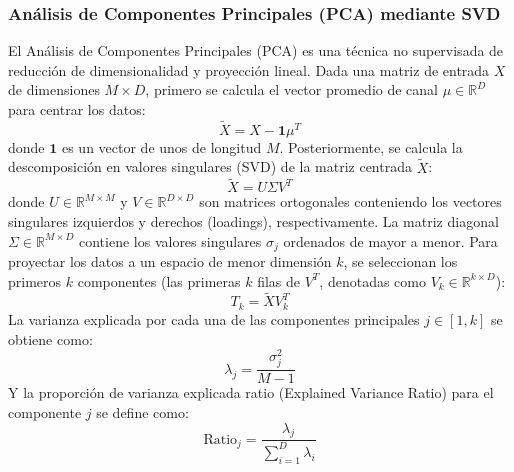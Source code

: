 \subsubsection{Análisis de Componentes Principales (PCA) mediante SVD}
El Análisis de Componentes Principales (PCA) es una técnica no supervisada de reducción de dimensionalidad y proyección lineal. Dada una matriz de entrada $X$ de dimensiones $M \times D$, primero se calcula el vector promedio de canal $\mu \in \mathbb{R}^D$ para centrar los datos:
\begin{equation}
    \tilde{X} = X - \mathbf{1}\mu^T
\end{equation}
donde $\mathbf{1}$ es un vector de unos de longitud $M$. Posteriormente, se calcula la descomposición en valores singulares (SVD) de la matriz centrada $\tilde{X}$:
\begin{equation}
    \tilde{X} = U \Sigma V^T
\end{equation}
donde $U \in \mathbb{R}^{M \times M}$ y $V \in \mathbb{R}^{D \times D}$ son matrices ortogonales conteniendo los vectores singulares izquierdos y derechos (loadings), respectivamente. La matriz diagonal $\Sigma \in \mathbb{R}^{M \times D}$ contiene los valores singulares $\sigma_j$ ordenados de mayor a menor. Para proyectar los datos a un espacio de menor dimensión $k$, se seleccionan los primeros $k$ componentes (las primeras $k$ filas de $V^T$, denotadas como $V_k \in \mathbb{R}^{k \times D}$):
\begin{equation}
    T_k = \tilde{X} V_k^T
\end{equation}
La varianza explicada por cada una de las componentes principales $j \in [1, k]$ se obtiene como:
\begin{equation}
    \lambda_j = \frac{\sigma_j^2}{M - 1}
\end{equation}
Y la proporción de varianza explicada ratio (Explained Variance Ratio) para el componente $j$ se define como:
\begin{equation}
    \text{Ratio}_j = \frac{\lambda_j}{\sum_{i=1}^{D} \lambda_i}
\end{equation}

